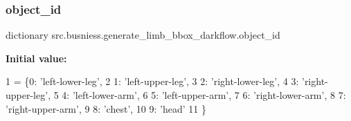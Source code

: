 \subsubsection{\texorpdfstring{object\+\_\+id}{object\_id}}
{\footnotesize\ttfamily dictionary src.\+busniess.\+generate\+\_\+limb\+\_\+bbox\+\_\+darkflow.\+object\+\_\+id}

{\bfseries Initial value\+:}
\begin{DoxyCode}
1 =  \{0: \textcolor{stringliteral}{'left-lower-leg'},
2              1: \textcolor{stringliteral}{'left-upper-leg'},
3              2: \textcolor{stringliteral}{'right-lower-leg'},
4              3: \textcolor{stringliteral}{'right-upper-leg'},
5              4: \textcolor{stringliteral}{'left-lower-arm'},
6              5: \textcolor{stringliteral}{'left-upper-arm'},
7              6: \textcolor{stringliteral}{'right-lower-arm'},
8              7: \textcolor{stringliteral}{'right-upper-arm'},
9              8: \textcolor{stringliteral}{'chest'},
10              9: \textcolor{stringliteral}{'head'}
11              \}
\end{DoxyCode}
